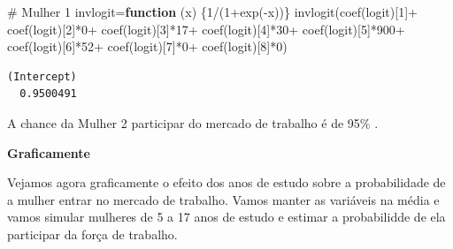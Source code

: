 \documentclass[
  letterpaper,
  DIV=11,
  numbers=noendperiod]{scrreprt}
\newenvironment{Shaded}{\begin{snugshade}}{\end{snugshade}}
\newcommand{\CommentTok}[1]{\textcolor[rgb]{0.37,0.37,0.37}{#1}}
\newcommand{\ControlFlowTok}[1]{\textcolor[rgb]{0.00,0.23,0.31}{\textbf{#1}}}
\newcommand{\DecValTok}[1]{\textcolor[rgb]{0.68,0.00,0.00}{#1}}
\newcommand{\FunctionTok}[1]{\textcolor[rgb]{0.28,0.35,0.67}{#1}}
\newcommand{\NormalTok}[1]{\textcolor[rgb]{0.00,0.23,0.31}{#1}}
\newcommand{\OtherTok}[1]{\textcolor[rgb]{0.00,0.23,0.31}{#1}}
\newcommand{\SpecialCharTok}[1]{\textcolor[rgb]{0.37,0.37,0.37}{#1}}
\begin{document}
\begin{Shaded}
\begin{Highlighting}[]
\CommentTok{\# Mulher 1}
\NormalTok{invlogit}\OtherTok{=}\ControlFlowTok{function}\NormalTok{ (x) \{}\DecValTok{1}\SpecialCharTok{/}\NormalTok{(}\DecValTok{1}\SpecialCharTok{+}\FunctionTok{exp}\NormalTok{(}\SpecialCharTok{{-}}\NormalTok{x))\}}
\FunctionTok{invlogit}\NormalTok{(}\FunctionTok{coef}\NormalTok{(logit)[}\DecValTok{1}\NormalTok{]}\SpecialCharTok{+}
           \FunctionTok{coef}\NormalTok{(logit)[}\DecValTok{2}\NormalTok{]}\SpecialCharTok{*}\DecValTok{0}\SpecialCharTok{+}
           \FunctionTok{coef}\NormalTok{(logit)[}\DecValTok{3}\NormalTok{]}\SpecialCharTok{*}\DecValTok{17}\SpecialCharTok{+}
           \FunctionTok{coef}\NormalTok{(logit)[}\DecValTok{4}\NormalTok{]}\SpecialCharTok{*}\DecValTok{30}\SpecialCharTok{+}
           \FunctionTok{coef}\NormalTok{(logit)[}\DecValTok{5}\NormalTok{]}\SpecialCharTok{*}\DecValTok{900}\SpecialCharTok{+}
           \FunctionTok{coef}\NormalTok{(logit)[}\DecValTok{6}\NormalTok{]}\SpecialCharTok{*}\DecValTok{52}\SpecialCharTok{+}
           \FunctionTok{coef}\NormalTok{(logit)[}\DecValTok{7}\NormalTok{]}\SpecialCharTok{*}\DecValTok{0}\SpecialCharTok{+}
           \FunctionTok{coef}\NormalTok{(logit)[}\DecValTok{8}\NormalTok{]}\SpecialCharTok{*}\DecValTok{0}\NormalTok{)}
\end{Highlighting}
\end{Shaded}

\begin{verbatim}
(Intercept) 
  0.9500491 
\end{verbatim}

A chance da Mulher 2 participar do mercado de trabalho é de 95\% .

\textbf{Graficamente}

Vejamos agora graficamente o efeito dos anos de estudo sobre a
probabilidade de a mulher entrar no mercado de trabalho. Vamos manter as
variáveis na média e vamos simular mulheres de 5 a 17 anos de estudo e
estimar a probabilidde de ela participar da força de trabalho.
\end{document}

